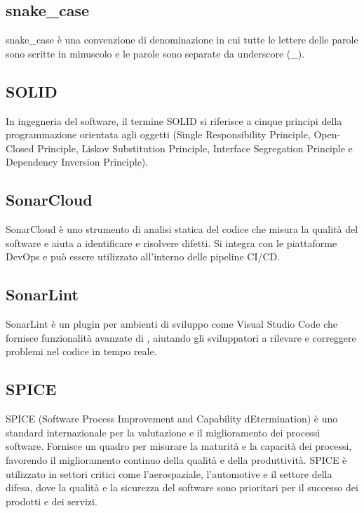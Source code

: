 \vspace{2em}
\subsection*{snake\_case}
\par snake_case è una convenzione di denominazione in cui tutte le lettere delle parole sono scritte in minuscolo e le parole sono separate da underscore (\_).

\vspace{2em}
\subsection*{SOLID}
\par In ingegneria del software, il termine SOLID si riferisce a cinque principi della programmazione orientata agli oggetti (Single Responsibility Principle, Open-Closed Principle, Liskov Substitution Principle, Interface Segregation Principle e Dependency Inversion Principle).

\vspace{2em}
\subsection*{SonarCloud}
\par SonarCloud è uno strumento di analisi statica del codice che misura la qualità del software e aiuta a identificare e risolvere difetti. Si integra con le piattaforme DevOps e può essere utilizzato all'interno delle pipeline CI/CD. 

\vspace{2em}
\subsection*{SonarLint}
\par SonarLint è un plugin per ambienti di sviluppo come Visual Studio Code che fornisce funzionalità avanzate di , aiutando gli sviluppatori a rilevare e correggere problemi nel codice in tempo reale.

\vspace{2em}
\subsection*{SPICE}
\par SPICE (Software Process Improvement and Capability dEtermination) è uno standard internazionale per la valutazione e il miglioramento dei processi software. Fornisce un quadro per misurare la maturità e la capacità dei processi, favorendo il miglioramento continuo della qualità e della produttività. SPICE è utilizzato in settori critici come l'aerospaziale, l'automotive e il settore della difesa, dove la qualità e la sicurezza del software sono prioritari per il successo dei prodotti e dei servizi.

